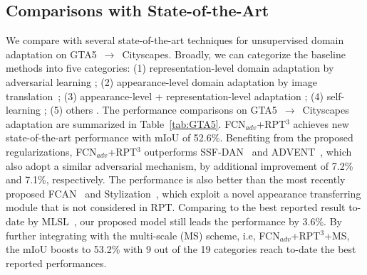 \documentclass[10pt,twocolumn,letterpaper]{article}
\begin{document}
\subsection{Comparisons with State-of-the-Art}
We compare with several state-of-the-art techniques for unsupervised domain adaptation on GTA5~$\to$~Cityscapes. Broadly, we can categorize the baseline methods into five categories: (1) representation-level domain adaptation by adversarial learning \cite{chen2018road,Du_2019_ICCV,pmlr-v80-hoffman18a,hong2018conditional,luo2019taking,sankaranarayanan2018learning,Tsai_2018_CVPR}; (2) appearance-level domain adaptation by image translation~\cite{dundar2018domain,murez2018image}; (3) appearance-level + representation-level adaptation \cite{chang2019all,wu2018dcan,Zhang_2018_CVPR}; (4) self-learning \cite{iqbal2019mlsl,lian2019constructing,zhang2018fully,zou2018unsupervised}; (5) others \cite{Chen_2019_ICCV,li2019bidirectional,saleh2018effective,zhang2017curriculum,zhu2018penalizing}. The performance comparisons on GTA5~$\to$~Cityscapes adaptation are summarized in Table~\ref{tab:GTA5}.
FCN$_{adv}$+RPT$^{3}$ achieves new state-of-the-art performance with mIoU of 52.6\%. Benefiting from the proposed regularizations, FCN$_{adv}$+RPT$^{3}$ outperforms SSF-DAN~\cite{Du_2019_ICCV} and ADVENT~\cite{Vu_2019_CVPR}, which also adopt a similar adversarial mechanism, by additional improvement of 7.2\% and 7.1\%, respectively. The performance is also better than the most recently proposed FCAN~\cite{Zhang_2018_CVPR} and Stylization~\cite{dundar2018domain}, which exploit a novel appearance transferring module that is not considered in RPT. Comparing to the best reported result to-date by MLSL~\cite{iqbal2019mlsl}, our proposed model still leads the performance by 3.6\%. By further integrating with the multi-scale (MS) scheme, i.e, FCN$_{adv}$+RPT$^{3}$+MS, the mIoU boosts to 53.2\% with 9 out of the 19 categories reach to-date the best reported performances.
\end{document}
